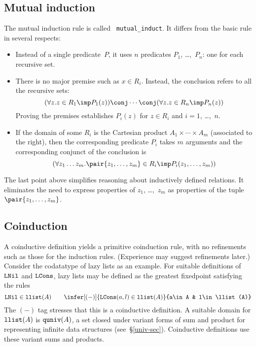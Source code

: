 \subsection{Mutual induction}
The mutual induction rule is called {\tt
mutual\_induct}.  It differs from the basic rule in several respects:
\begin{itemize}
\item Instead of a single predicate~$P$, it uses $n$ predicates $P_1$,
\ldots,~$P_n$: one for each recursive set.

\item There is no major premise such as $x\in R_i$.  Instead, the conclusion
refers to all the recursive sets:
\[ (\forall z.z\in R_1\imp P_1(z))\conj\cdots\conj
   (\forall z.z\in R_n\imp P_n(z))
\]
Proving the premises establishes $P_i(z)$ for $z\in R_i$ and $i=1$,
\ldots,~$n$.

\item If the domain of some $R_i$ is the Cartesian product
  $A_1\times\cdots\times A_m$ (associated to the right), then the
  corresponding predicate $P_i$ takes $m$ arguments and the corresponding
  conjunct of the conclusion is
\[ (\forall z_1\ldots z_m.\pair{z_1,\ldots,z_m}\in R_i\imp P_i(z_1,\ldots,z_m))
\]
\end{itemize}
The last point above simplifies reasoning about inductively defined
relations.  It eliminates the need to express properties of $z_1$,
\ldots,~$z_m$ as properties of the tuple $\pair{z_1,\ldots,z_m}$.

\subsection{Coinduction}\label{coind-sec}
A coinductive definition yields a primitive coinduction rule, with no
refinements such as those for the induction rules.  (Experience may suggest
refinements later.)  Consider the codatatype of lazy lists as an example.  For
suitable definitions of $\hbox{\tt LNil}$ and $\hbox{\tt LCons}$, lazy lists may be defined as the
greatest fixedpoint satisfying the rules
\[  \LNil\in\llist(A)  \qquad 
    \infer[(-)]{\LCons(a,l)\in\llist(A)}{a\in A & l\in\llist(A)}
\]
The $(-)$ tag stresses that this is a coinductive definition.  A suitable
domain for $\hbox{\tt llist}(A)$ is $\hbox{\tt quniv}(A)$, a set closed under variant forms of
sum and product for representing infinite data structures
(see~\S\ref{univ-sec}).  Coinductive definitions use these variant sums and
products.

